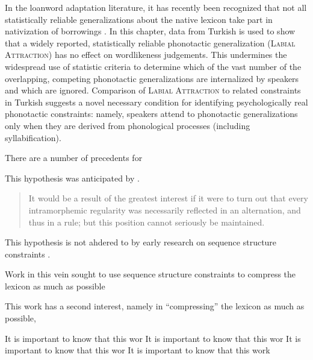In the loanword adaptation literature, it has recently been recognized that not all statistically reliable generalizations about the native lexicon take part in nativization of borrowings \citep[e.g.,][]{Ito1995a,Ito1995b,Ussishkin2003}. In this chapter, data from Turkish is used to show that a widely reported, statistically reliable phonotactic generalization (\textsc{Labial Attraction}) has no effect on wordlikeness judgements. This undermines the widespread use of statistic criteria to determine which of the vast number of the overlapping, competing phonotactic generalizations are internalized by speakers and which are ignored. Comparison of \textsc{Labial Attraction} to related constraints in Turkish suggests a novel necessary condition for identifying psychologically real phonotactic constraints: namely, speakers attend to phonotactic generalizations only when they are derived from phonological processes (including syllabification).

There are a number of precedents for 

This hypothesis was anticipated by \cite[][283]{Anderson1974}.

\begin{quote}
It would be a result of the greatest interest if it were to turn out that every intramorphemic regularity was necessarily reflected in an alternation, and thus in a rule; but this position cannot seriously be maintained. \citep[][283]{Anderson1974}
\end{quote}



This hypothesis is not ahdered to by early research on sequence structure constraints \citep[e.g.,][]{SPR,Chomsky1965,SPE,Stanley1967}. 


Work in this vein sought to use sequence structure constraints to compress the lexicon as much as possible 


This work has a second interest, namely in ``compressing'' the lexicon as much as possible, 

It is important to know that this wor It is important to know that this wor It is important to know that this wor It is important to know that this work


